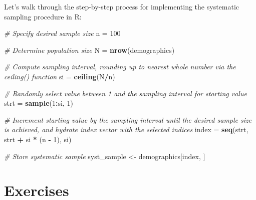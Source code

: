 \documentclass[]{book}
\newenvironment{Shaded}{\begin{snugshade}}{\end{snugshade}}
\newcommand{\CommentTok}[1]{\textcolor[rgb]{0.56,0.35,0.01}{\textit{#1}}}
\newcommand{\DecValTok}[1]{\textcolor[rgb]{0.00,0.00,0.81}{#1}}
\newcommand{\KeywordTok}[1]{\textcolor[rgb]{0.13,0.29,0.53}{\textbf{#1}}}
\newcommand{\NormalTok}[1]{#1}
\newcommand{\OperatorTok}[1]{\textcolor[rgb]{0.81,0.36,0.00}{\textbf{#1}}}
\newcommand{\StringTok}[1]{\textcolor[rgb]{0.31,0.60,0.02}{#1}}
\begin{document}
Let's walk through the step-by-step process for implementing the systematic sampling procedure in R:

\begin{Shaded}
\begin{Highlighting}[]
\CommentTok{# Specify desired sample size}
\NormalTok{n =}\StringTok{ }\DecValTok{100}

\CommentTok{# Determine population size}
\NormalTok{N =}\StringTok{ }\KeywordTok{nrow}\NormalTok{(demographics)}

\CommentTok{# Compute sampling interval, rounding up to nearest whole number via the ceiling() function}
\NormalTok{si =}\StringTok{ }\KeywordTok{ceiling}\NormalTok{(N}\OperatorTok{/}\NormalTok{n)}

\CommentTok{# Randomly select value between 1 and the sampling interval for starting value}
\NormalTok{strt =}\StringTok{ }\KeywordTok{sample}\NormalTok{(}\DecValTok{1}\OperatorTok{:}\NormalTok{si, }\DecValTok{1}\NormalTok{)}

\CommentTok{# Increment starting value by the sampling interval until the desired sample size is achieved, and hydrate index vector with the selected indices}
\NormalTok{index =}\StringTok{ }\KeywordTok{seq}\NormalTok{(strt, strt }\OperatorTok{+}\StringTok{ }\NormalTok{si }\OperatorTok{*}\StringTok{ }\NormalTok{(n }\OperatorTok{-}\StringTok{ }\DecValTok{1}\NormalTok{), si)}

\CommentTok{# Store systematic sample}
\NormalTok{syst_sample <-}\StringTok{ }\NormalTok{demographics[index, ]}
\end{Highlighting}
\end{Shaded}

\hypertarget{exercises-1}{%
\section{Exercises}\label{exercises-1}}
\end{document}
